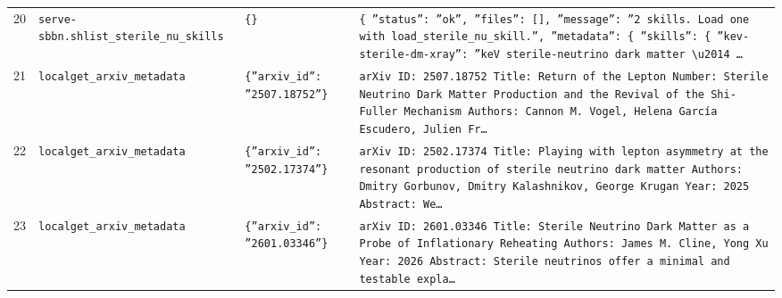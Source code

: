\documentclass[11pt,a4paper]{article}
\begin{document}
\begin{longtable}{@{}p{}p{}p{}p{}@{}}
20 & \texttt{serve-sbbn.sh}\newline\texttt{list\_\allowbreak{}sterile\_\allowbreak{}nu\_\allowbreak{}skills} & \texttt{\{\}\allowbreak{}} & \texttt{\{   ''status'':\allowbreak{} ''ok'',\allowbreak{}   ''files'':\allowbreak{} []\allowbreak{},\allowbreak{}   ''message'':\allowbreak{} ''2 skills. Load one with load\_\allowbreak{}sterile\_\allowbreak{}nu\_\allowbreak{}skill.'',\allowbreak{}   ''metadata'':\allowbreak{} \{     ''skills'':\allowbreak{} \{       ''kev-sterile-dm-xray'':\allowbreak{} ''keV sterile-neutrino dark matter \textbackslash{}\allowbreak{}u2014 \ldots{}\allowbreak{}} \\
21 & \texttt{local}\newline\texttt{get\_\allowbreak{}arxiv\_\allowbreak{}metadata} & \texttt{\{''arxiv\_\allowbreak{}id'':\allowbreak{} ''2507.18752''\}\allowbreak{}} & \texttt{arXiv ID:\allowbreak{} 2507.18752 Title:\allowbreak{} Return of the Lepton Number:\allowbreak{} Sterile Neutrino Dark Matter Production and the Revival of the Shi-Fuller Mechanism Authors:\allowbreak{} Cannon M. Vogel,\allowbreak{} Helena García Escudero,\allowbreak{} Julien Fr\ldots{}\allowbreak{}} \\
22 & \texttt{local}\newline\texttt{get\_\allowbreak{}arxiv\_\allowbreak{}metadata} & \texttt{\{''arxiv\_\allowbreak{}id'':\allowbreak{} ''2502.17374''\}\allowbreak{}} & \texttt{arXiv ID:\allowbreak{} 2502.17374 Title:\allowbreak{} Playing with lepton asymmetry at the resonant production of sterile neutrino dark matter Authors:\allowbreak{} Dmitry Gorbunov,\allowbreak{} Dmitry Kalashnikov,\allowbreak{} George Krugan Year:\allowbreak{} 2025 Abstract:\allowbreak{} We\ldots{}\allowbreak{}} \\
23 & \texttt{local}\newline\texttt{get\_\allowbreak{}arxiv\_\allowbreak{}metadata} & \texttt{\{''arxiv\_\allowbreak{}id'':\allowbreak{} ''2601.03346''\}\allowbreak{}} & \texttt{arXiv ID:\allowbreak{} 2601.03346 Title:\allowbreak{} Sterile Neutrino Dark Matter as a Probe of Inflationary Reheating Authors:\allowbreak{} James M. Cline,\allowbreak{} Yong Xu Year:\allowbreak{} 2026 Abstract:\allowbreak{} Sterile neutrinos offer a minimal and testable expla\ldots{}\allowbreak{}} \\

\end{longtable}
\end{document}
